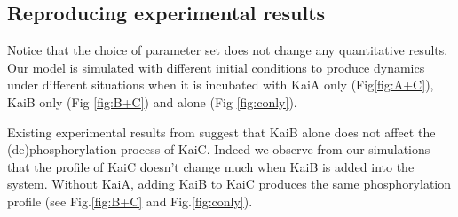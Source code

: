 \documentclass[a4paper,10pt]{article}
\numberwithin{equation}{section}
\begin{document}
\subsection{Reproducing experimental results}

Notice that the choice of parameter set does not change any quantitative results. Our model is simulated with different initial conditions to produce dynamics under different situations when it is incubated with KaiA only (Fig\ref{fig:A+C}), KaiB only  (Fig \ref{fig:B+C}) and alone (Fig \ref{fig:conly}). 

Existing experimental results from \citet{kitayama2003} suggest that KaiB alone does not affect the (de)phosphorylation process of KaiC. Indeed we observe from our simulations that the profile of KaiC doesn't change much when KaiB is added into the system. Without KaiA, adding KaiB to KaiC produces the same phosphorylation profile (see Fig.\ref{fig:B+C} and Fig.\ref{fig:conly}).
\end{document}
